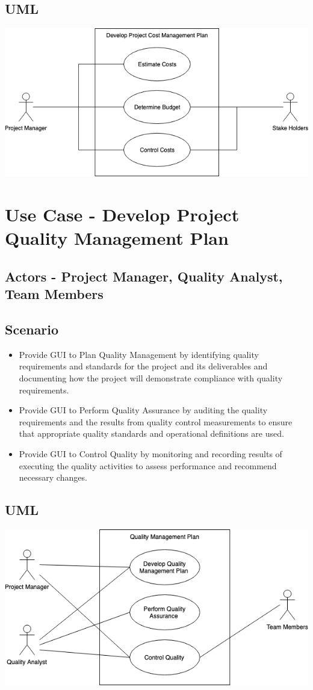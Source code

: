 \documentclass[10pt]{article}
\begin{document}
\subsection{UML}
\includegraphics[width=\textwidth]{usecase2}

\newpage
\section{Use Case - Develop Project Quality Management Plan}
\subsection{Actors - Project Manager, Quality Analyst, Team Members}
\subsection{Scenario}
\begin{itemize}
  \item Provide GUI to Plan Quality Management by identifying quality requirements and standards for the project and its deliverables and documenting how the project will demonstrate compliance with quality requirements.
  \item Provide GUI to Perform Quality Assurance by auditing the quality requirements and the results from quality control measurements to ensure that appropriate quality standards and operational definitions are used.
  \item Provide GUI to Control Quality by monitoring and recording results of executing the quality activities to assess performance and recommend necessary changes.
  
\end{itemize}

\subsection{UML}
\includegraphics[width=\textwidth]{usecase3}
\end{document}
